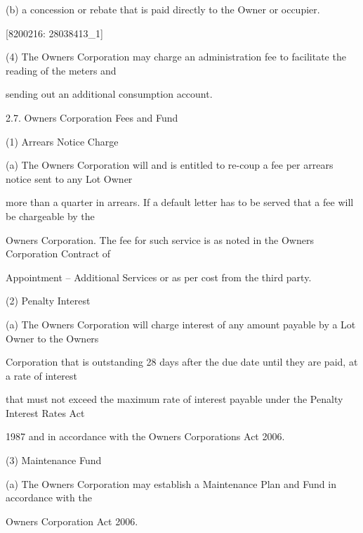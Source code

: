 \documentclass{article}
\begin{document}
{\fontsize{9.962}{1}(b) a concession or rebate that is paid directly to the Owner or occupier. }

\newpage
















{\fontsize{7.02}{1}[8200216: 28038413\_1] }


{\fontsize{9.962}{1}(4) The Owners Corporation may charge an administration fee to facilitate the reading of the meters and }

{\fontsize{10.02}{1}sending out an additional consumption account. }

{\fontsize{9.99}{1}2.7. Owners Corporation Fees and Fund }

{\fontsize{9.962}{1}(1) Arrears Notice Charge }

{\fontsize{9.962}{1}(a) The Owners Corporation will and is entitled to re-coup a fee per arrears notice sent to any Lot Owner }

{\fontsize{10.02}{1}more than a quarter in arrears. If a default letter has to be served that a fee will be chargeable by the }

{\fontsize{10.02}{1}Owners Corporation. The fee for such service is as noted in the Owners Corporation Contract of }

{\fontsize{10.02}{1}Appointment – Additional Services or as per cost from the third party. }

{\fontsize{9.962}{1}(2) Penalty Interest }

{\fontsize{9.962}{1}(a) The Owners Corporation will charge interest of any amount payable by a Lot Owner to the Owners }

{\fontsize{10.02}{1}Corporation that is outstanding 28 days after the due date until they are paid, at a rate of interest }

{\fontsize{10.02}{1}that must not exceed the maximum rate of interest payable under the Penalty Interest Rates Act }

{\fontsize{10.02}{1}1987 and in accordance with the Owners Corporations Act 2006. }

{\fontsize{9.962}{1}(3) Maintenance Fund }

{\fontsize{9.962}{1}(a) The Owners Corporation may establish a Maintenance Plan and Fund in accordance with the }

{\fontsize{10.02}{1}Owners Corporation Act 2006. }
\end{document}
